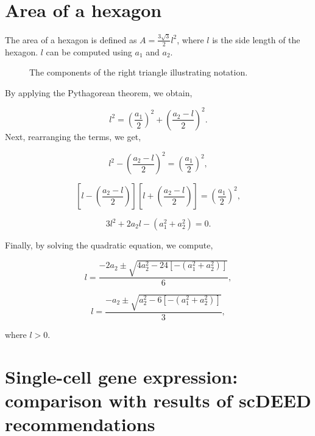 \documentclass[
  12pt]{article}
\begin{document}
\section{Area of a hexagon}\label{area-of-a-hexagon}

The area of a hexagon is defined as \(A = \frac{3\sqrt{3}}{2}l^2\),
where \(l\) is the side length of the hexagon. \(l\) can be computed
using \(a_1\) and \(a_2\).

\begin{figure}


\caption{\label{fig-tri-param}The components of the right triangle
illustrating notation.}

\end{figure}%

By applying the Pythagorean theorem, we obtain,

\[
l^2 = \left(\frac{a_1}{2}\right)^2 + \left(\frac{a_2 - l}{2}\right)^2.
\] Next, rearranging the terms, we get,

\[
l^2 - \left(\frac{a_2 - l}{2}\right)^2 = \left(\frac{a_1}{2}\right)^2,
\]

\[
\left[l - \left(\frac{a_2 - l}{2}\right)\right]\left[l + \left(\frac{a_2 - l}{2}\right)\right] = \left(\frac{a_1}{2}\right)^2,
\]

\[
3l^2 + 2a_2l - (a_1^2 + a_2^2) = 0.
\]

Finally, by solving the quadratic equation, we compute,

\[
l = \frac{-2a_2 \pm \sqrt{4a_2^2 - 24[-(a_1^2 + a_2^2)]}}{6},
\]

\[
l = \frac{-a_2 \pm \sqrt{a_2^2 - 6[-(a_1^2 + a_2^2)]}}{3},
\]

where \(l > 0\).

\section{Single-cell gene expression: comparison with results of scDEED
recommendations}\label{single-cell-gene-expression-comparison-with-results-of-scdeed-recommendations}
\end{document}
